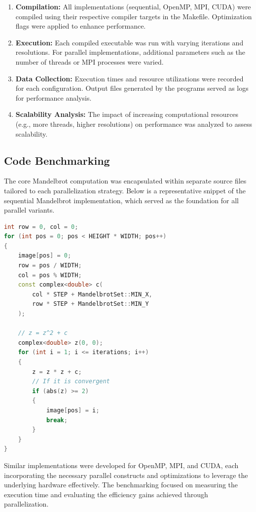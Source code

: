 \documentclass[
	report, %
	11pt, %
]{CSUniSchoolLabReport}
\newcounter{ct}
\begin{document}
\begin{enumerate}
	\item \textbf{Compilation:} All implementations (sequential, OpenMP, MPI, CUDA) were compiled using their respective compiler targets in the Makefile. Optimization flags were applied to enhance performance.
	\item \textbf{Execution:} Each compiled executable was run with varying iterations and resolutions. For parallel implementations, additional parameters such as the number of threads or MPI processes were varied.
	\item \textbf{Data Collection:} Execution times and resource utilizations were recorded for each configuration. Output files generated by the programs served as logs for performance analysis.
	\item \textbf{Scalability Analysis:} The impact of increasing computational resources (e.g., more threads, higher resolutions) on performance was analyzed to assess scalability.
\end{enumerate}

\subsection{Code Benchmarking}

The core Mandelbrot computation was encapsulated within separate source files tailored to each parallelization strategy. Below is a representative snippet of the sequential Mandelbrot implementation, which served as the foundation for all parallel variants.

\begin{lstlisting}[language=C++, caption={Sequential Mandelbrot Implementation}, label={lst:mandelbrot_seq}]
int row = 0, col = 0;
for (int pos = 0; pos < HEIGHT * WIDTH; pos++)
{
	image[pos] = 0;
	row = pos / WIDTH;
	col = pos % WIDTH;
	const complex<double> c(
		col * STEP + MandelbrotSet::MIN_X,
		row * STEP + MandelbrotSet::MIN_Y
	);

	// z = z^2 + c
	complex<double> z(0, 0);
	for (int i = 1; i <= iterations; i++)
	{
		z = z * z + c;
		// If it is convergent
		if (abs(z) >= 2)
		{
			image[pos] = i;
			break;
		}
	}
}
\end{lstlisting}

\noindent Similar implementations were developed for OpenMP, MPI, and CUDA, each incorporating the necessary parallel constructs and optimizations to leverage the underlying hardware effectively. The benchmarking focused on measuring the execution time and evaluating the efficiency gains achieved through parallelization.
\end{document}
